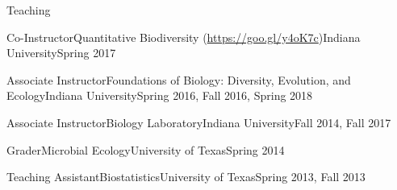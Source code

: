 \documentclass{resume} %
\begin{document}
\bigskip

\begin{rSection}{Teaching}

\begin{Course}
  {Co-Instructor}{Quantitative Biodiversity (\url{https://goo.gl/y4oK7c})}{Indiana University}{Spring 2017}
\end{Course}

\begin{Course}
  {Associate Instructor}{Foundations of Biology: Diversity, Evolution, and Ecology}{Indiana University}{Spring 2016, Fall 2016, Spring 2018}
\end{Course}

\begin{Course}
  {Associate Instructor}{Biology Laboratory}{Indiana University}{Fall 2014, Fall 2017}
\end{Course}

\begin{Course}
  {Grader}{Microbial Ecology}{University of Texas}{Spring 2014}
\end{Course}

\begin{Course}
  {Teaching Assistant}{Biostatistics}{University of Texas}{Spring 2013, Fall 2013}
\end{Course}

\end{rSection}

\bigskip
\end{document}
